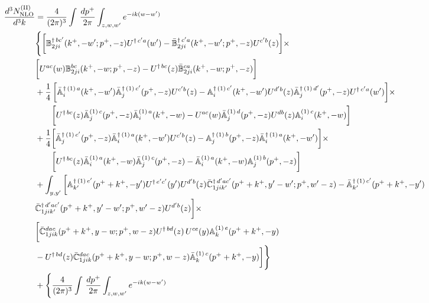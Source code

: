 \documentclass[aps,prd,amsmath,amssymb,nofootinbib]{revtex4-2}
\def\mf#1{\mathbb{#1}}
\numberwithin{equation}{section}
\begin{document}
\begin{align}\label{eq:CS2}
     \frac{d^{3}N_{\rm NLO}^{\rm (II)}}{d^{3}k} & = \frac{4}{(2\pi)^{3}} \int\, \frac{dp^{+}}{2\pi}\int_{z,w,w^{\prime}} e^{-ik(w-w^{\prime})} \notag \\ & 
    \Bigg\{\bigg[\mf{B}^{\dagger\, bc^{\prime}}_{2ji}(k^{+},-w^{\prime};p^{+},-z)U^{\dagger\, c^{\prime}a}(w^{\prime}) -\Bar{\mf{B}}^{\dagger\, c^{\prime}a}_{2ji}(k^{+},-w^{\prime}; p^{+},-z)U^{c^{\prime}b}(z)\bigg]\times\notag \\ & \bigg[U^{ac}(w) \mf{B}^{bc}_{2ji}(k^{+},-w;p^{+},-z) -U^{\dagger\, bc}(z)\Bar{\mf{B}}^{ca}_{2ji}(k^{+},-w; p^{+},-z)\bigg]\notag \\ & + \frac{1}{4}\,\bigg[\Bar{\mf{A}}^{\dagger\, (1)\, a}_{i}(k^{+},-w^{\prime})\Bar{\mf{A}}^{\dagger\, (1)\, c^{\prime}}_{j}(p^{+},-z)U^{c^{\prime}b}(z)-\mf{A}^{\dagger\, (1)\, c^{\prime}}_{i}(k^{+},- w^{\prime})U^{d^{\prime}b}(z)\Bar{\mf{A}}^{\dagger\, (1)\, d^{\prime}}_{j}(p^{+},-z)U^{\dagger\, c^{\prime}a}(w^{\prime})  \bigg]\times\notag \\ & \quad \quad\bigg[U^{\dagger\, bc}(z)\Bar{\mf{A}}^{(1)\, c}_{j}(p^{+},-z)\Bar{\mf{A}}^{(1)\, a}_{i}(k^{+},-w)-U^{ac}(w) \Bar{\mf{A}}^{(1)\, d}_{j}(p^{+},-z)U^{db}(z) \mf{A}^{(1)\, c}_{i}(k^{+},- w)\bigg] \notag \\ & +\frac{1}{4}\bigg[\Bar{\mf{A}}^{\dagger\,(1)\, c^{\prime}}_{j}(p^{+},-z)\Bar{\mf{A}}^{\dagger\, (1)\, a}_{i}(k^{+},- w^{\prime})U^{c^{\prime}b}(z) - \mf{A}^{\dagger\, (1)\, b}_{j}(p^{+},- z)\Bar{\mf{A}}^{\dagger\, (1)\, a}_{i}(k^{+},- w^{\prime})\bigg]\times\notag \\ & \quad \quad\bigg[U^{\dagger\, bc}(z)\Bar{\mf{A}}^{(1)\, a}_{i}(k^{+},- w)\Bar{\mf{A}}^{(1)\, c}_{j}(p^{+},-z)-\Bar{\mf{A}}^{(1)\, a}_{i}(k^{+},- w) \mf{A}^{(1)\, b}_{j}(p^{+},- z)\bigg]\notag \\ & + \int_{y,y^{\prime}}\bigg[\mf{A}^{\dagger\, (1)\,e^{\prime}}_{k^{\prime}}(p^{+}+k^{+},-y^{\prime})U^{\dagger\, e^{\prime}c^{\prime}}(y^{\prime})U^{d^{\prime}b}(z) \Bar{\mf{C}}^{\dagger\, d^{\prime}ac^{\prime}}_{1jik^{\prime}}(p^{+}+k^{+},y^{\prime}-w^{\prime}; p^{+},w^{\prime}-z)  -\Bar{\mf{A}}^{\dagger\, (1)\,c^{\prime}}_{k^{\prime}}(p^{+}+k^{+},-y^{\prime})\notag \\ & \Bar{\mf{C}}^{\dagger\, d^{\prime}ac^{\prime}}_{1jik^{\prime}}(p^{+}+k^{+},y^{\prime}-w^{\prime}; p^{+},w^{\prime}-z)U^{d^{\prime}b}(z)\bigg]\times\notag \\ & \bigg[\Bar{\mf{C}}^{dac}_{1jik}(p^{+}+k^{+},y-w; p^{+},w-z)U^{\dagger\, bd}(z)\,U^{ce}(y) \mf{A}^{(1)\,e}_{k}(p^{+}+k^{+},-y)\notag \\ & -U^{\dagger\, bd}(z) \Bar{\mf{C}}^{dac}_{1jik}(p^{+}+k^{+},y-w; p^{+},w-z)\Bar{\mf{A}}^{(1)\,c}_{k}(p^{+}+k^{+},-y)\bigg] \Bigg\}\notag \\ & + \Bigg\{\frac{4}{(2\pi)^{3}} \int\, \frac{dp^{+}}{2\pi}\int_{z,w,w^{\prime}} e^{-ik(w-w^{\prime})}\notag \\ & 

\end{align}
\end{document}
